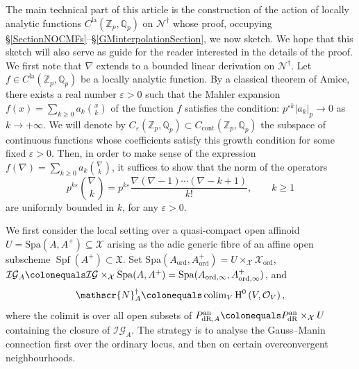 \documentclass[10pt, oneside]{amsart}
\newcommand{\defeq}{\colonequals}
\numberwithin{equation}{subsection}
\theoremstyle{definition}
\theoremstyle{remark}
\newcommand{\mbb}[1]{\mathbb{#1}}
\newcommand{\opn}[1]{\operatorname{#1}}
\def\Q{\mathbb{Q}}
\def\Z{{\mathbb{Z}}}
\def\Spa{\mathrm{Spa}}
\begin{document}
The main technical part of this article is the construction of the action of locally analytic functions $C^{\opn{la}}(\mbb{Z}_p, \mbb{Q}_p)$ on $\mathscr{N}^{\dagger}$ whose proof, occupying \S \ref{SectionNOCMFs}--\S \ref{GMinterpolationSection}, we now sketch. We hope that this sketch will also serve as guide for the reader interested in the details of the proof. We first note that $\nabla$ extends to a bounded linear derivation on $\mathscr{N}^{\dagger}$. Let $f \in C^{\opn{la}}(\Z_p, \Q_p)$ be a locally analytic function. By a classical theorem of Amice, there exists a real number $\varepsilon > 0$ such that the Mahler expansion $f(x) = \sum_{k \geq 0} a_k \binom{x}{k}$ of the function $f$ satisfies the condition: $p^{\varepsilon k}|a_k|_p \to 0$ as $k \to +\infty$. We will denote by $C_{\varepsilon}(\Z_p, \Q_p) \subset C_{\opn{cont}}(\mbb{Z}_p, \mbb{Q}_p)$ the subspace of continuous functions whose coefficients satisfy this growth condition for some fixed $\varepsilon > 0$. Then, in order to make sense of the expression $f(\nabla) = \sum_{k \geq 0} a_k \binom{\nabla}{k}$, it suffices to show that the norm of the operators
\[
p^{k \varepsilon} \binom{\nabla}{k} = p^{k \varepsilon} \frac{\nabla (\nabla - 1) \cdots (\nabla - k+1)}{k!}, \quad \quad k \geq 1
\]
are uniformly bounded in $k$, for any $\varepsilon > 0$.

We first consider the local setting over a quasi-compact open affinoid $U = \Spa(A, A^+) \subseteq \mathcal{X}$ arising as the adic generic fibre of an affine open subscheme $\opn{Spf}(A^+) \subset \mathfrak{X}$. Set $\Spa(A_{\opn{ord}}, A^+_{\opn{ord}}) = U \times_{\mathcal{X}} \mathcal{X}_{\opn{ord}}$,  $\mathcal{IG}_{A} \defeq \mathcal{IG} \times_{\mathcal{X}} \Spa(A, A^+) = \Spa(A_{\opn{ord}, \infty}, A^+_{\opn{ord}, \infty})$, and \[ \mathscr{N}^{\dagger}_A \defeq \opn{colim}_V \opn{H}^0\left( V, \mathcal{O}_V \right), \] where the colimit is over all open subsets of $P_{\opn{dR}, A}^{\opn{an}} \defeq P_{\opn{dR}}^{\opn{an}} \times_{\mathcal{X}} U$ containing the closure of $\mathcal{IG}_A$. The strategy is to analyse the Gauss--Manin connection first over the ordinary locus, and then on certain overconvergent neighbourhoods.
\end{document}
